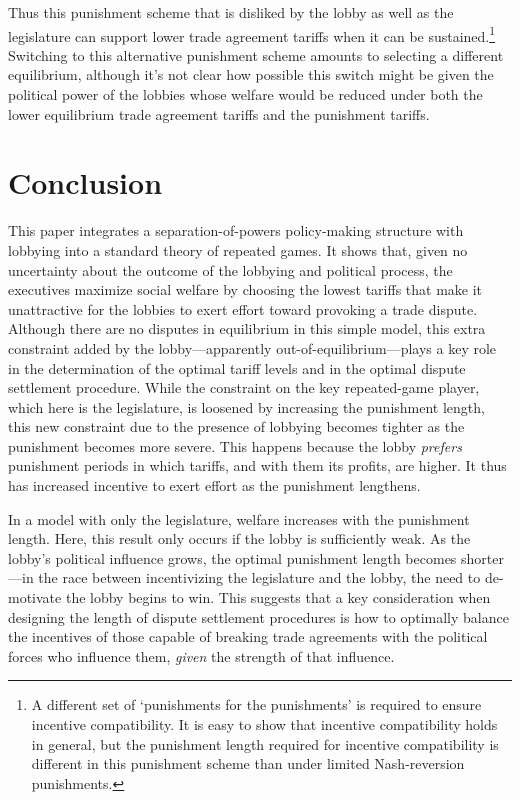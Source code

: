 \documentclass[authoryear, review]{elsarticle}
\begin{document}
Thus this punishment scheme that is disliked by the lobby as well as the legislature can support lower trade agreement tariffs when it can be sustained.\footnote{A different set of `punishments for the punishments' is required to ensure incentive compatibility. It is easy to show that incentive compatibility holds in general, but the punishment length required for incentive compatibility is different in this punishment scheme than under limited Nash-reversion punishments.} Switching to this alternative punishment scheme amounts to selecting a different equilibrium, although it's not clear how possible this switch might be given the political power of the lobbies whose welfare would be reduced under both the lower equilibrium trade agreement tariffs and the punishment tariffs.


\section{Conclusion}
\label{sec:concl3}
This paper integrates a separation-of-powers policy-making structure with lobbying into a standard theory of repeated games. It shows that, given no uncertainty about the outcome of the lobbying and political process, the executives maximize social welfare by choosing the lowest tariffs that make it unattractive for the lobbies to exert effort toward provoking a trade dispute. Although there are no disputes in equilibrium in this simple model, this extra constraint added by the lobby---apparently out-of-equilibrium---plays a key role in the determination of the optimal tariff levels and in the optimal dispute settlement procedure. While the constraint on the key repeated-game player, which here is the legislature, is loosened by increasing the punishment length, this new constraint due to the presence of lobbying becomes tighter as the punishment becomes more severe. This happens because the lobby \textit{prefers} punishment periods in which tariffs, and with them its profits, are higher. It thus has increased incentive to exert effort as the punishment lengthens.

In a model with only the legislature, welfare increases with the punishment length. Here, this result only occurs if the lobby is sufficiently weak. As the lobby's political influence grows, the optimal punishment length becomes shorter---in the race between incentivizing the legislature and the lobby, the need to de-motivate the lobby begins to win. This suggests that a key consideration when designing the length of dispute settlement procedures is how to optimally balance the incentives of those capable of breaking trade agreements with the political forces who influence them, \textit{given} the strength of that influence.
\end{document}
